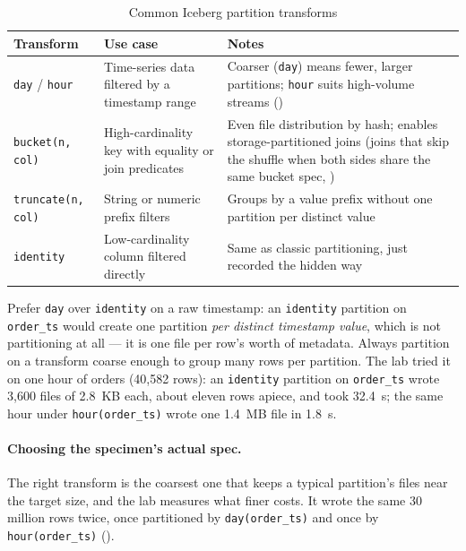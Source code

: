 \begin{table}[htbp]
\centering
\caption{Common Iceberg partition transforms}
\label{tab:ice-transforms}
\begin{tabular}{@{}P{2.9cm}P{4.7cm}P{7.3cm}@{}}
\toprule
\textbf{Transform} & \textbf{Use case} & \textbf{Notes} \\
\midrule
\texttt{day} / \texttt{hour} & Time-series data filtered by a timestamp range &
  Coarser (\texttt{day}) means fewer, larger partitions; \texttt{hour} suits
  high-volume streams () \\
\texttt{bucket(n, col)} & High-cardinality key with equality or join
  predicates & Even file distribution by hash; enables storage-partitioned
  joins (joins that skip the shuffle when both sides share the same bucket
  spec, ) \\
\texttt{truncate(n, col)} & String or numeric prefix filters & Groups by a
  value prefix without one partition per distinct value \\
\texttt{identity} & Low-cardinality column filtered directly & Same as
  classic partitioning, just recorded the hidden way \\
\bottomrule
\end{tabular}
\end{table}

\begin{tip}
Prefer \texttt{day} over \texttt{identity} on a raw timestamp: an
\texttt{identity} partition on \texttt{order\_ts} would create one partition
\emph{per distinct timestamp value}, which is not partitioning at all --- it is
one file per row's worth of metadata. Always partition on a transform coarse
enough to group many rows per partition. The lab tried it on one hour of orders
(40,582 rows): an \texttt{identity} partition on \texttt{order\_ts} wrote 3,600
files of 2.8~KB each, about eleven rows apiece, and took 32.4~s; the same hour
under \texttt{hour(order\_ts)} wrote one 1.4~MB file in 1.8~s.
\end{tip}

\paragraph{Choosing the specimen's actual spec.} The right transform is the
coarsest one that keeps a typical partition's files near the target size, and the
lab measures what finer costs. It wrote the same 30 million rows twice, once
partitioned by \texttt{day(order\_ts)} and once by \texttt{hour(order\_ts)}
().

